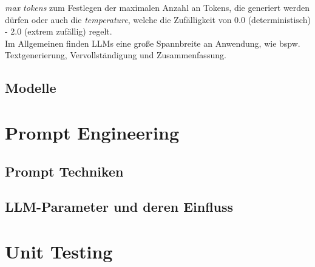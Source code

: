 \textit{max tokens} zum Festlegen der maximalen Anzahl an Tokens, die generiert werden dürfen oder auch die \textit{temperature}, welche die Zufälligkeit von 0.0 (deterministisch) - 2.0 (extrem zufällig) regelt.\\ Im Allgemeinen finden LLMs eine große Spannbreite an Anwendung, wie bspw. Textgenerierung, Vervollständigung und Zusammenfassung. \cite*{dhadukHowLargeLanguage2023}

\subsection{Modelle}


\section{Prompt Engineering}

\subsection{Prompt Techniken}

\subsection{LLM-Parameter und deren Einfluss}

\section{Unit Testing}


